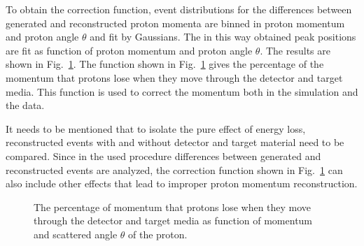 To obtain the correction function, event distributions for the differences between generated
and reconstructed proton momenta are binned in proton momentum and proton angle $\theta$ and fit by Gaussians. The in this way obtained peak positions are fit as function of proton momentum and proton angle $\theta$.
The results are shown in Fig.~\ref{fig:eloss}. The function shown in Fig.~\ref{fig:eloss} gives the percentage of  the momentum that protons lose when they move through the detector and target media.
This function is used to correct the momentum both in the simulation and the data.

It needs to be mentioned that to isolate the pure effect of energy loss, reconstructed events with and without detector and target material need to be compared. Since in the used procedure differences between generated and reconstructed events are analyzed, the correction function shown in Fig.~\ref{fig:eloss} can also include other effects that lead to improper proton momentum reconstruction.

\begin{figure}[htp]
\begin{center}
\caption{\small The percentage of momentum that protons lose when they move through the detector and target media as function of momentum and scattered angle $\theta$ of the proton. \label{fig:eloss}} 
\end{center}
\end{figure}
